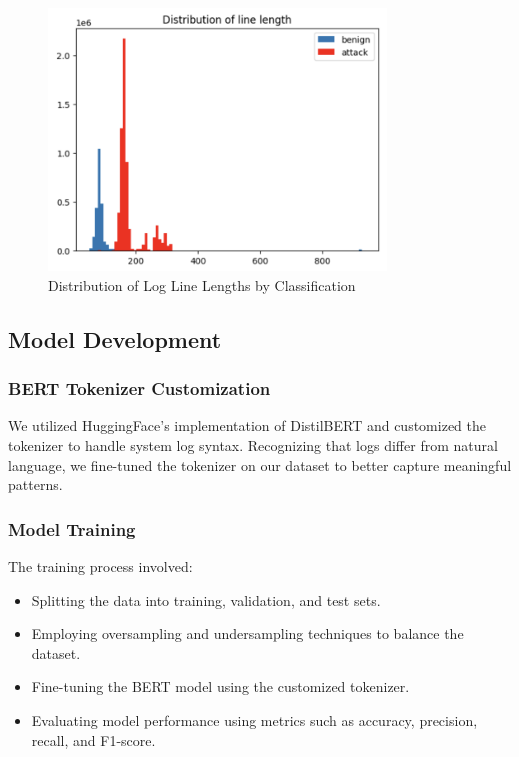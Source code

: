 \documentclass[12pt]{article}
\begin{document}
\begin{figure}[H]
    \centering
    \includegraphics[width=0.8\textwidth]{linelength_distribution.png}
    \caption{Distribution of Log Line Lengths by Classification}
    \label{fig:linelength}
\end{figure}

\subsection{Model Development}

\subsubsection{BERT Tokenizer Customization}

We utilized HuggingFace's implementation of DistilBERT \cite{distilbert} and customized the tokenizer to handle system log syntax. Recognizing that logs differ from natural language, we fine-tuned the tokenizer on our dataset to better capture meaningful patterns.

\subsubsection{Model Training}

The training process involved:

\begin{itemize}
    \item Splitting the data into training, validation, and test sets.
    \item Employing oversampling and undersampling techniques to balance the dataset.
    \item Fine-tuning the BERT model using the customized tokenizer.
    \item Evaluating model performance using metrics such as accuracy, precision, recall, and F1-score.
\end{itemize}
\end{document}
